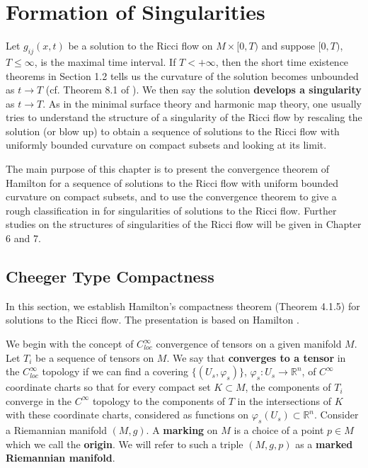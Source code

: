 \chapter{Formation of Singularities}
\label{chap:cz-singularity-formation}

\bigskip
Let $g_{ij}(x,t)$ be a solution to the Ricci flow on $M\times
[0,T)$ and suppose $[0,T)$, $T\le \infty$, is the maximal time
interval. If $T<+\infty$, then the short time existence theorems
in Section 1.2 tells us the curvature of the solution becomes
unbounded as $t\rightarrow T$ (cf. Theorem 8.1 of \cite{Ha95F}).
We then say the solution \textbf{develops a
singularity} as
$t\rightarrow T$. As in the minimal surface theory and harmonic
map theory, one usually tries to understand the structure of a
singularity of the Ricci flow by rescaling the solution (or blow
up) to obtain a sequence of solutions to the Ricci flow with
uniformly bounded curvature on compact subsets and looking at its
limit.

The main purpose of this chapter is to present the convergence
theorem of Hamilton \cite{Ha95} for a sequence of solutions to the
Ricci flow with uniform bounded curvature on compact subsets, and
to use the convergence theorem to give a rough classification in
\cite{Ha95F} for singularities of solutions to the Ricci flow.
Further studies on the structures of singularities of the Ricci
flow will be given in Chapter 6 and 7.


\section{Cheeger Type Compactness}

In this section, we establish Hamilton's compactness theorem
(Theorem 4.1.5) for solutions to the Ricci flow. The presentation
is based on Hamilton \cite{Ha95}.

We begin with the concept of $C_{loc}^{\infty}$ convergence of
tensors on a given manifold $M$. Let ${T_i}$ be a sequence of
tensors on $M$. We say that \mbox{} {\bf converges
to a tensor} \mbox{} in the $C_{loc}^{\infty}$ topology if we can find a
covering $\{(U_s,\varphi_s)\}$, $\varphi_s: U_s\rightarrow
\mathbb{R}^n$, of $C^\infty$ coordinate charts so that for every
compact set $K\subset M$, the components of $T_i$ converge in the
$C^\infty$ topology to the components of $T$ in the intersections
of $K$ with these coordinate charts, considered as functions on
$\varphi_s(U_s)\subset \mathbb{R}^n$. Consider a Riemannian
manifold $(M,g)$. A {\bf marking} on $M$ is a
choice of a point $p\in M$ which we call the {\bf
origin}. We will refer to such a triple $(M,g,p)$ as
a {\bf marked Riemannian manifold}.


